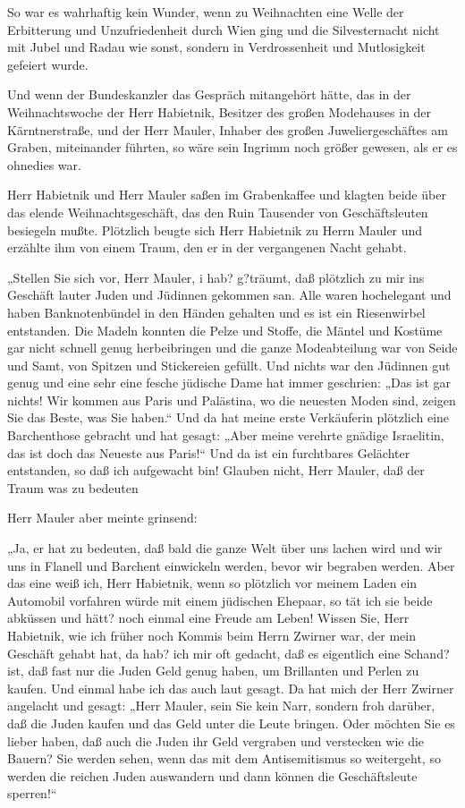 So war es wahrhaftig kein Wunder, wenn zu Weihnachten eine Welle
der Erbitterung und Unzufriedenheit durch Wien ging und die
Silvesternacht nicht mit Jubel und Radau wie sonst, sondern in
Verdrossenheit und Mutlosigkeit gefeiert wurde.

Und wenn der Bundeskanzler das Gespräch mitangehört hätte, das in
der Weihnachtswoche der Herr Habietnik, Besitzer des großen
Modehauses in der Kärntnerstraße, und der Herr Mauler, Inhaber des
großen Juweliergeschäftes am Graben, miteinander führten, so wäre
sein Ingrimm noch größer gewesen, als er es ohnedies war.

Herr Habietnik und Herr Mauler saßen im Grabenkaffee und klagten
beide über das elende Weihnachtsgeschäft, das den Ruin Tausender
von Geschäftsleuten besiegeln mußte. Plötzlich beugte sich Herr
Habietnik zu Herrn Mauler und erzählte ihm von einem Traum, den er
in der vergangenen Nacht gehabt.

„Stellen Sie sich vor, Herr Mauler, i hab? g?träumt, daß plötzlich
zu mir ins Geschäft lauter Juden und Jüdinnen gekommen san. Alle
waren hochelegant und haben Banknotenbündel in den Händen gehalten
und es ist ein Riesenwirbel entstanden. Die Madeln konnten die
Pelze  und Stoffe, die Mäntel und Kostüme gar nicht
schnell genug herbeibringen und die ganze Modeabteilung war von
Seide und Samt, von Spitzen und Stickereien gefüllt. Und nichts war
den Jüdinnen gut genug und eine sehr eine fesche jüdische Dame hat
immer geschrien: „Das ist gar nichts! Wir kommen aus Paris und
Palästina, wo die neuesten Moden sind, zeigen Sie das Beste, was
Sie haben.“ Und da hat meine erste Verkäuferin plötzlich eine
Barchenthose gebracht und hat gesagt: „Aber meine verehrte gnädige
Israelitin, das ist doch das Neueste aus Paris!“ Und da ist ein
furchtbares Gelächter entstanden, so daß ich aufgewacht bin!
Glauben  nicht, Herr Mauler, daß der Traum was zu
bedeuten 

Herr Mauler aber meinte grinsend:

„Ja, er hat zu bedeuten, daß bald die ganze Welt über uns lachen
wird und wir uns in Flanell und Barchent einwickeln werden, bevor
wir begraben werden. Aber das eine weiß ich, Herr Habietnik, wenn
so plötzlich vor meinem Laden ein Automobil vorfahren würde mit
einem jüdischen Ehepaar, so tät ich sie beide abküssen und hätt?
noch einmal eine Freude am Leben! Wissen Sie, Herr Habietnik, wie
ich früher noch Kommis beim Herrn Zwirner war, der mein Geschäft
gehabt hat, da hab? ich mir oft gedacht, daß es eigentlich eine
Schand? ist, daß fast nur die Juden Geld genug haben, um Brillanten
und Perlen zu kaufen. Und einmal habe ich das auch laut gesagt. Da
hat mich der Herr Zwirner angelacht und gesagt: „Herr Mauler, sein
Sie kein Narr, sondern froh darüber, daß die Juden kaufen und das
Geld unter die Leute bringen. Oder möchten  Sie es
lieber haben, daß auch die Juden ihr Geld vergraben und verstecken
wie die Bauern? Sie werden sehen, wenn das mit dem Antisemitismus
so weitergeht, so werden die reichen Juden auswandern und dann
können die Geschäftsleute sperren!“

